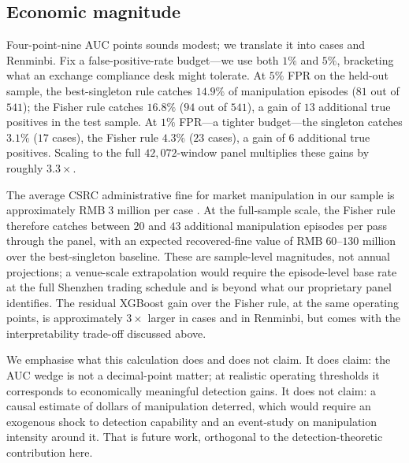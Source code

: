 \documentclass[11pt,a4paper]{article}
\theoremstyle{definition}
\theoremstyle{remark}
\newcommand{\1}{\mathbf{1}}
\begin{document}
\subsection{Economic magnitude}
\label{sec:emp-magnitude}
Four-point-nine AUC points sounds modest; we translate it into cases and Renminbi. Fix a false-positive-rate budget---we use both $1\%$ and $5\%$, bracketing what an exchange compliance desk might tolerate. At $5\%$ FPR on the held-out sample, the best-singleton rule catches $14.9\%$ of manipulation episodes ($81$ out of $541$); the Fisher rule catches $16.8\%$ ($94$ out of $541$), a gain of $13$ additional true positives in the test sample. At $1\%$ FPR---a tighter budget---the singleton catches $3.1\%$ ($17$ cases), the Fisher rule $4.3\%$ ($23$ cases), a gain of $6$ additional true positives. Scaling to the full $42{,}072$-window panel multiplies these gains by roughly $3.3\times$.

The average CSRC administrative fine for market manipulation in our sample is approximately $\mathrm{RMB}\;3$ million per case \citep{dai2026sdfmm}. At the full-sample scale, the Fisher rule therefore catches between $20$ and $43$ additional manipulation episodes per pass through the panel, with an expected recovered-fine value of $\mathrm{RMB}\;60$--$130$ million over the best-singleton baseline. These are sample-level magnitudes, not annual projections; a venue-scale extrapolation would require the episode-level base rate at the full Shenzhen trading schedule and is beyond what our proprietary panel identifies. The residual XGBoost gain over the Fisher rule, at the same operating points, is approximately $3\times$ larger in cases and in Renminbi, but comes with the interpretability trade-off discussed above.

We emphasise what this calculation does and does not claim. It does claim: the AUC wedge is not a decimal-point matter; at realistic operating thresholds it corresponds to economically meaningful detection gains. It does not claim: a causal estimate of dollars of manipulation deterred, which would require an exogenous shock to detection capability and an event-study on manipulation intensity around it. That is future work, orthogonal to the detection-theoretic contribution here.
\end{document}

